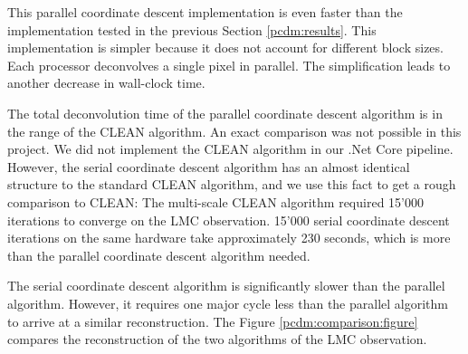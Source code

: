 This parallel coordinate descent implementation is even faster than the implementation tested in the previous Section \ref{pcdm:results}. This implementation is simpler because it does not account for different block sizes. Each processor deconvolves a single pixel in parallel. The simplification leads to another decrease in wall-clock time.

The total deconvolution time of the parallel coordinate descent algorithm is in the range of the CLEAN algorithm. An exact comparison was not possible in this project. We did not implement the CLEAN algorithm in our .Net Core pipeline. However, the serial coordinate descent algorithm has an almost identical structure to the standard CLEAN algorithm, and we use this fact to get a rough comparison to CLEAN: The multi-scale CLEAN algorithm required 15'000 iterations to converge on the LMC observation. 15'000 serial coordinate descent iterations on the same hardware take approximately 230 seconds, which is more than the parallel coordinate descent algorithm needed.

The serial coordinate descent algorithm is significantly slower than the parallel algorithm. However, it requires one major cycle less than the parallel algorithm to arrive at a similar reconstruction. The Figure \ref{pcdm:comparison:figure} compares the reconstruction of the two algorithms of the LMC observation.

